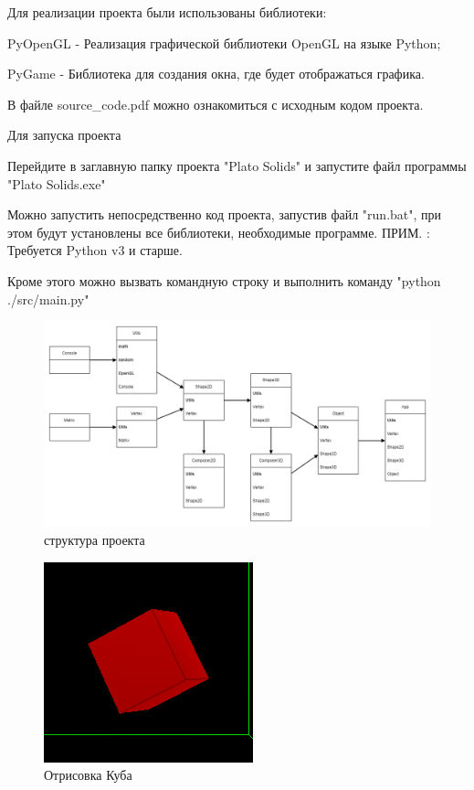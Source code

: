 \documentclass[12pt, a4paper]{article}
\begin{document}
\hfill \break

Для реализации проекта были использованы библиотеки:
\begin{list}{-}{}
	\item PyOpenGL - Реализация графической библиотеки OpenGL на языке Python;
	\item PyGame - Библиотека для создания окна, где будет отображаться графика.
\end{list}

\hfill \break

В файле source\_code.pdf можно ознакомиться с исходным кодом проекта.

\hfill \break

Для запуска проекта
\begin{list}{}{}
	\item Перейдите в заглавную папку проекта "Plato Solids" и запустите файл программы "Plato Solids.exe"
	\item Можно запустить непосредственно код проекта, запустив файл "run.bat", при этом будут установлены все библиотеки, необходимые программе.
	ПРИМ. : Требуется Python v3 и старше.
	\item Кроме этого можно вызвать командную строку и выполнить команду "python ./src/main.py"
\end{list}

\hfill \break

\begin{figure}[h]
	\centering
	\includegraphics[scale=.35]{structure}
	\caption{структура проекта}
	\label{fig:mesh1}
\end{figure}

\begin{figure}[h]
	\centering
	\includegraphics[scale=1.25]{cube}
	\caption{Отрисовка Куба}
	\label{fig:mesh1}
\end{figure}
\end{document}
